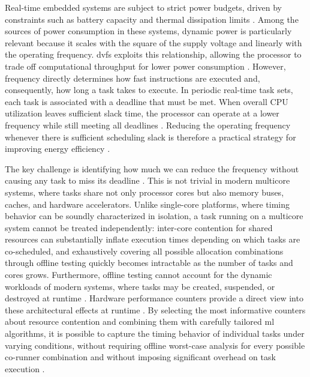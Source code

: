 \documentclass[journal]{IEEEtran}
\begin{document}
Real-time embedded systems are subject to strict power budgets, driven by constraints such as battery capacity and thermal dissipation limits \cite{rahim2025survey}. Among the sources of power consumption in these systems, dynamic power is particularly relevant because it scales with the square of the supply voltage and linearly with the operating frequency. \acrfull{dvfs} exploits this relationship, allowing the processor to trade off computational throughput for lower power consumption \cite{ul2018task}. However, frequency directly determines how fast instructions are executed and, consequently, how long a task takes to execute. In periodic real-time task sets, each task is associated with a deadline that must be met. When overall CPU utilization leaves sufficient slack time, the processor can operate at a lower frequency while still meeting all deadlines \cite{ul2018task}. Reducing the operating frequency whenever there is sufficient scheduling slack is therefore a practical strategy for improving energy efficiency \cite{hoffmann2021online}.

The key challenge is identifying how much we can reduce the frequency without causing any task to miss its deadline \cite{ul2018task, hoffmann2021online}. This is not trivial in modern multicore systems, where tasks share not only processor cores but also memory buses, caches, and hardware accelerators. Unlike single-core platforms, where timing behavior can be soundly characterized in isolation, a task running on a multicore system cannot be treated independently: inter-core contention for shared resources can substantially inflate execution times depending on which tasks are co-scheduled, and exhaustively covering all possible allocation combinations through offline testing quickly becomes intractable as the number of tasks and cores grows. Furthermore, offline testing cannot account for the dynamic workloads of modern systems, where tasks may be created, suspended, or destroyed at runtime \cite{gracioli2019designing, horstmann2019framework, lugo2022survey}. Hardware performance counters provide a direct view into these architectural effects at runtime \cite{hoffmann2021online}. By selecting the most informative counters about resource contention and combining them with carefully tailored \acrfull{ml} algorithms, it is possible to capture the timing behavior of individual tasks under varying conditions, without requiring offline worst-case analysis for every possible co-runner combination and without imposing significant overhead on task execution \cite{hoffmann2021online}.
\end{document}

